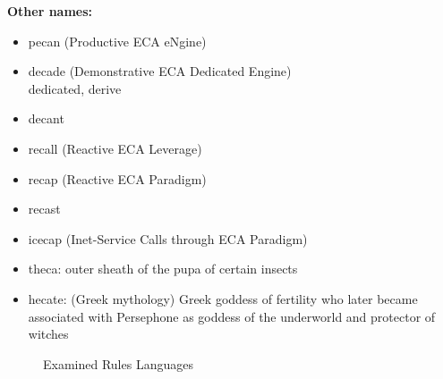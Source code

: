 \documentclass[11pt]{article}%
\begin{document}
\textbf{Other names:}
\begin{itemize}
  \item pecan (Productive ECA eNgine)
  \item decade (Demonstrative ECA Dedicated Engine)
    \\dedicated, derive
  \item decant
  \item recall (Reactive ECA Leverage)
  \item recap (Reactive ECA Paradigm)
  \item recast
  \item icecap (Inet-Service Calls through ECA Paradigm)
  \item theca: outer sheath of the pupa of certain insects
  \item hecate: (Greek mythology) Greek goddess of fertility who later became associated with Persephone as goddess of the underworld and protector of witches
\end{itemize}



\newpage
\begin{figure}[htb]
\centering
\caption{Examined Rules Languages}
\end{figure}

\end{document}
